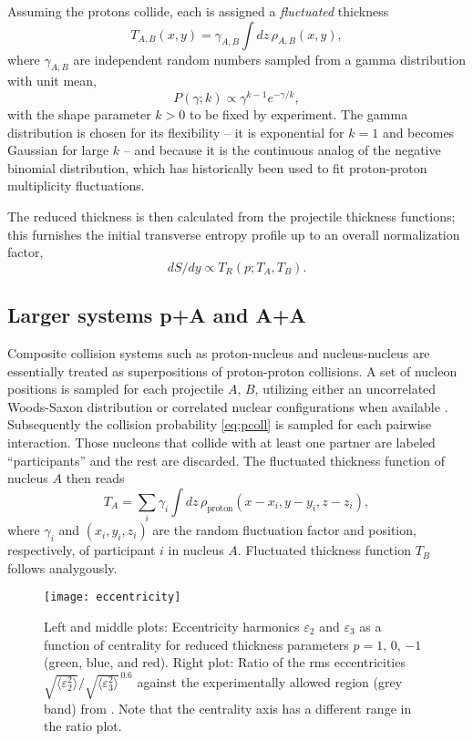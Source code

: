 \documentclass[aps,prl,reprint,amsmath,nofootinbib]{revtex4-1}
\newcommand{\eccratio}{\sqrt{\langle \varepsilon_2^2 \rangle}/\sqrt{\langle \varepsilon_3^2 \rangle}^{\,0.6}}
\begin{document}
Assuming the protons collide, each is assigned a \emph{fluctuated} thickness
\begin{equation}
  T_{A,B}(x, y) = \gamma_{A,B} \int dz \, \rho_{A,B}(x, y),
\end{equation}
where $\gamma_{A,B}$ are independent random numbers sampled from a gamma distribution with unit mean,
\begin{equation}
  P(\gamma; k) \propto \gamma^{k-1} e^{-\gamma/k},
\end{equation}
with the shape parameter $k > 0$ to be fixed by experiment.  The gamma distribution is chosen for its
flexibility -- it is exponential for $k = 1$ and becomes Gaussian for large $k$ -- and because it is the
continuous analog of the negative binomial distribution, which has historically been used to fit proton-proton
multiplicity fluctuations.

The reduced thickness is then calculated from the projectile thickness functions; this furnishes the initial
transverse entropy profile up to an overall normalization factor, 
\begin{equation}
dS/dy \propto T_R(p; T_A, T_B).
\end{equation}

\subsection{Larger systems p+A and A+A}

Composite collision systems such as proton-nucleus and nucleus-nucleus are essentially treated as
superpositions of proton-proton collisions.  A set of nucleon positions is sampled for each
projectile $A$, $B$, utilizing either an uncorrelated Woods-Saxon distribution or correlated nuclear configurations 
when available \cite{Alvioli:2009ab}. Subsequently the collision probability \eqref{eq:pcoll} is sampled for each 
pairwise interaction. Those nucleons that collide with at least one partner are labeled ``participants'' and the 
rest are discarded. The fluctuated thickness function of nucleus $A$ then reads
\begin{equation}
  T_A = \sum_i \gamma_i \int dz \, \rho_\text{proton}(x - x_i, y - y_i, z - z_i),
  \label{nuclear thickness}
\end{equation}
where $\gamma_i$ and $(x_i, y_i, z_i)$ are the random fluctuation factor and position, respectively, of
participant $i$ in nucleus $A$. Fluctuated thickness function $T_B$ follows analygously. 

\begin{figure*}[t]
  \texttt{[image: eccentricity]}
  \caption{
    \label{fig:eccen}
    Left and middle plots:  Eccentricity harmonics $\varepsilon_2$ and $\varepsilon_3$ as a function of centrality 
    for reduced thickness parameters $p = 1$, 0, $-1$ (green, blue, and red).  Right plot:  Ratio of the rms eccentricities 
    $\eccratio$ against the experimentally allowed region (grey band) from \cite{Retinskaya:2013gca}.  Note that the centrality 
    axis has a different range in the ratio plot.
  }
\end{figure*}
\end{document}
